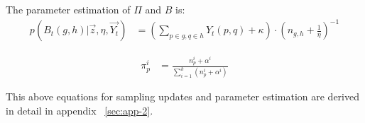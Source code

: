 The parameter estimation of $\Pi$ and $B$ is:
\begin{eqnarray}
p(B_t(g,h) | \overset{\rightarrow}{z}, \eta, \overset{\rightarrow}{Y_t}) &= (\sum_{p \in g, q \in h} Y_t(p,q) + \kappa) \cdot (n_{g,h} + \frac{1}{\eta})^{-1}
\end{eqnarray}

\begin{eqnarray}
\pi_p^i &= \frac{n_p^i + \alpha^i}{\sum_{i=1}^{k} (n_p^i + \alpha^{i})}
\end{eqnarray}

This above equations for sampling updates and parameter estimation are derived in detail in appendix ~\ref{sec:app-2}.






